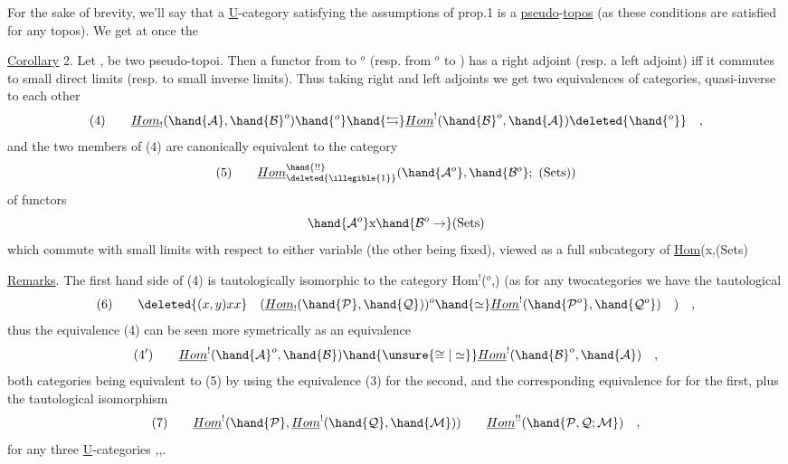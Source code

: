 
For the sake of brevity, we'll say that a \uline{U}-category satisfying the
assumptions of prop.1 is a \uline{pseudo}-\uline{topos} (as these conditions are satisfied
for any topos). We get at once the

\uline{Corollary} 2. Let , be two pseudo-topoi. Then a functor from
 to $^{o}$ (resp. from $^{o}$ to  ) has a right adjoint (resp. a left
adjoint) iff it commutes to small direct limits (resp. to small inverse
limits). Thus taking right and left adjoints we get two equivalences of
categories, quasi-inverse to each other
\[ (4) \qquad \underline{Hom}_{!}(\hand{\mathcal{A}},\hand{\mathcal{B}}^{o})\hand{{}^{o}}\hand{\leftrightarrows}\underline{Hom}^{!}(\hand{\mathcal{B}}^{o},\hand{\mathcal{A}})\deleted{\hand{{}^{o}}} \quad , \]
and the two members of (4) are canonically equivalent to the  category
\[ (5) \qquad \underline{Hom}^{\hand{!!}}_{\deleted{\illegible{1}}}(\hand{\mathcal{A}^{o}},\hand{\mathcal{B}^{o}};\text{ (Sets)}) \]
of functors
\[ \hand{\mathcal{A}^{o}}\text{x}\hand{\mathcal{B}^{o}\to}\text{(Sets)} \]
which commute with small  limits with respect to either variable
(the other being fixed), viewed as a full subcategory of \uline{Hom}(x,(Sets\hand{)})

\uline{Remarks}. The first hand side of (4) is tautologically isomorphic to
the category Hom$^{!}$($^{o}$,) (as for any twocategories we have the
 tautological  
\[ (6) \qquad \deleted{(x,y)xx} \quad (\underline{Hom}_{!}(\hand{\mathcal{P}},\hand{\mathcal{Q}}))^{o}\hand{\simeq}\underline{Hom}^{!}(\hand{\mathcal{P}^{o}},\hand{\mathcal{Q}^{o}}) \quad ) \quad , \]
thus the equivalence (4) can be seen more symetrically as an equivalence
\[ (4') \qquad \underline{Hom}^{!}(\hand{\mathcal{A}}^{o},\hand{\mathcal{B}})\hand{\unsure{\cong|\simeq}}\underline{Hom}^{!}(\hand{\mathcal{B}}^{o},\hand{\mathcal{A}}) \quad , \]
both categories being equivalent to (5) by using the equivalence (3)
for the second, and the corresponding equivalence for  for the first,
plus the tautological isomorphism
\[ (7) \qquad \underline{Hom}^{!}(\hand{\mathcal{P}},\underline{Hom}^{!}(\hand{\mathcal{Q}},\hand{\mathcal{M}})) \qquad \underline{Hom}^{!!}(\hand{\mathcal{P},\mathcal{Q};\mathcal{M}}) \quad , \]
for any three \uline{U}-categories ,,.

